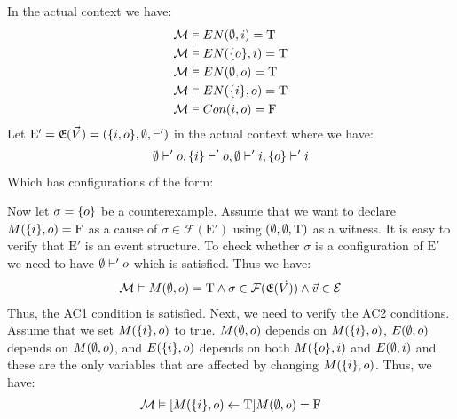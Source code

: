 \begin{example}
    In the actual context we have:
    \begin{align*}
        \mathcal{M} & \vDash EN(\emptyset,i) = \mathrm{T}    \\
        \mathcal{M} & \vDash EN(\{o\},i) = \mathrm{T} \\
        \mathcal{M} & \vDash EN(\emptyset,o) = \mathrm{T}    \\
        \mathcal{M} & \vDash EN(\{i\},o) = \mathrm{T} \\
        \mathcal{M} & \vDash Con(i,o) = \mathrm{F}    \\
    \end{align*}
    Let $\mathrm{E'} = \mathfrak{E}(\vec V) = (\{i,o\},\emptyset,\vdash')$
    in the actual context where we have:
    \begin{align*}
        \emptyset \vdash' o, \{i\} \vdash' o, \emptyset \vdash' i,
        \{o\} \vdash' i
    \end{align*}
    Which has configurations of the form:
    \begin{center}
    \end{center}
    Now let $\sigma = \{o\}$ be a counterexample.
    Assume that we want to declare $M(\{i\},o) = \mathrm{F}$ as a cause of
    $\sigma \in \mathcal{F}(\mathrm{E'})$ using $(\emptyset,\emptyset,\mathrm{T})$ as a witness.
    It is easy to verify that $\mathrm{E'}$ is an event structure.
    To check whether $\sigma$ is a configuration of $\mathrm{E'}$ we need
    to have $\emptyset \vdash' o$ which is satisfied.
    Thus we have:
    \begin{align*}
        \mathcal{M} \vDash M(\emptyset,o) = \mathrm{T} \wedge \sigma
        \in \mathcal{F}(\mathfrak{E}(\vec V)) \wedge \vec v \in \mathcal{E}
    \end{align*}
    Thus, the AC1 condition is satisfied.
    Next, we need to verify the AC2 conditions.
    Assume that we set $M(\{i\},o)$ to true.
    $M(\emptyset,o)$ depends on $M(\{i\},o)$, $E(\emptyset,o)$ depends on $M(\emptyset,o)$, and 
    $E(\{i\},o)$ depends on both $M(\{o\},i)$ and $E(\emptyset,i)$
    and these are the only variables that are affected by changing 
    $M(\{i\},o)$.
    Thus, we have:
    \begin{align*}
        \m & \vDash [M(\s{i},o)\la \T] M(\e,o) = \F    \\

\end{align*}
\end{example}
